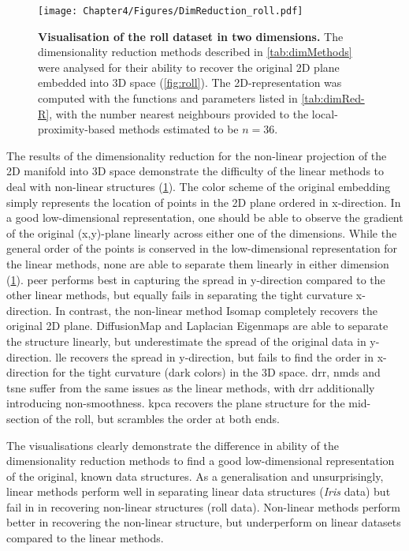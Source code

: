 \begin{figure}[hbtp]
	\centering
	\texttt{[image: Chapter4/Figures/DimReduction\_roll.pdf]}
	\caption[\textbf{Visualisation of the roll dataset in two dimensions.}]{\textbf{Visualisation of the roll dataset in two dimensions.} The dimensionality reduction methods described in \cref{tab:dimMethods} were analysed for their ability to recover the original 2D plane embedded into 3D space (\cref{fig:roll}). The 2D-representation was computed with the functions and parameters listed in \cref{tab:dimRed-R}, with the number nearest neighbours provided to the local-proximity-based methods estimated to be \(n=36\). } 
	 	\label{fig:dimRed-roll}
\end{figure}


The results of the dimensionality reduction for the non-linear projection of the 2D manifold into 3D space demonstrate the difficulty of the linear methods to deal with non-linear structures (\cref{fig:dimRed-roll}). The color scheme of the original embedding simply represents the location of points in the 2D plane ordered in x-direction. In a good low-dimensional representation, one should be able to observe the gradient of the original (x,y)-plane linearly across either one of the dimensions. While the general order of the points is conserved in the low-dimensional representation for the linear methods, none are able to separate them linearly in either dimension (\cref{fig:dimRed-roll}). \gls{peer} performs best in capturing the spread in y-direction compared to the other linear methods, but equally fails in separating the tight curvature x-direction. In contrast, the non-linear method Isomap completely recovers the original 2D plane. DiffusionMap and Laplacian Eigenmaps are able to separate the structure linearly, but underestimate the spread of the original data in y-direction. \gls{lle} recovers the spread in y-direction, but fails to find the order in x-direction for the tight curvature (dark colors) in the 3D space. \gls{drr}, \gls{nmds} and \gls{tsne} suffer from the same issues as the linear methods, with \gls{drr} additionally introducing non-smoothness. \gls{kpca} recovers the plane structure for the mid-section of the roll, but scrambles the order at both ends. 

The visualisations clearly demonstrate the difference in ability of the dimensionality reduction methods to find a good low-dimensional representation of the original, known data structures. As a generalisation and unsurprisingly, linear methods perform well in separating linear data structures (\textit{Iris} data) but fail in in recovering non-linear structures (roll data). Non-linear methods perform better in recovering the non-linear structure, but underperform on linear datasets compared to the linear methods. 

